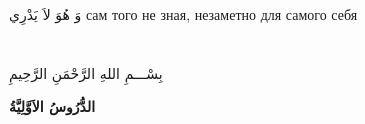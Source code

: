 \documentclass[a5paper]{article}
\newcommand\textstyleDropCaps[1]{#1}
\newcommand\textstyleCaptioncharacters[1]{#1}
\begin{document}
\textstyleCaptioncharacters{وَ هُوَ لاَ يَدْرِي }\textstyleDropCaps{сам того не зная, незаметно для самого себя‎}

\section{}

\bigskip

\section{}
\section{}
\section[]{}
{\centering
بِسْـــمِ اللهِ الرَّحْمَنِ الرَّحِيمِ
\par}

{\centering\bfseries
الدُّرُوسُ الاَوَّلِيَّةُ
\par}


\bigskip
\end{document}
